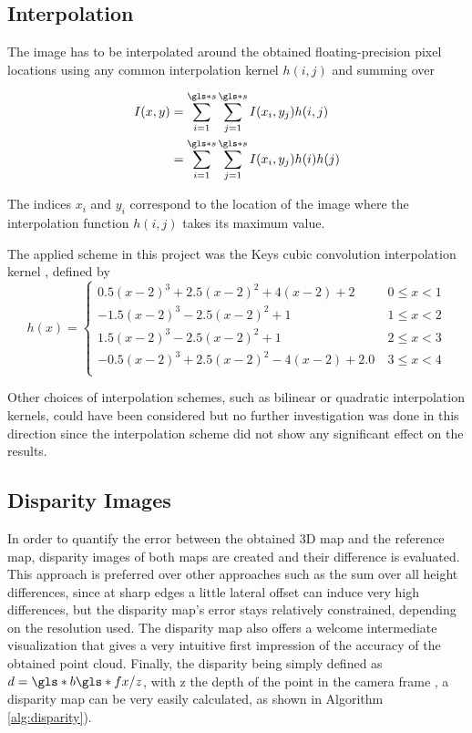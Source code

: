\subsection{Interpolation}

The image has to be interpolated around the obtained floating-precision pixel
locations using any common interpolation kernel $h(i, j)$ and summing over 

\begin{align}
  I(x, y) &= \summ{i}{s} \summ{j}{s} I(x_i, y_j) h(i, j) \\
  &= \summ{i}{s} \summ{j}{s} I(x_i, y_j) h(i) h(j)
  \label{eq:basics:interpolation}
\end{align}

The indices $x_i$ and $y_i$ correspond to the location of the image where the
interpolation function $h(i, j)$ takes its maximum value.

The applied scheme in this project was the 
Keys cubic convolution interpolation kernel \cite{Keys1981}, defined by
\begin{equation}
  h(x) = 
  \begin{cases}
     0.5(x - 2)^3 + 2.5(x-2)^2+4(x-2) + 2 & \ 0 \leq x < 1 \\
     -1.5(x-2)^3 - 2.5(x-2)^2 + 1 & \ 1 \leq x < 2 \\
     1.5(x-2)^3 - 2.5(x-2)^2 + 1 & \ 2 \leq x < 3 \\
     -0.5(x -2)^3 + 2.5(x-2)^2 - 4(x-2) + 2.0 & \ 3 \leq x < 4 \\
  \end{cases}
\end{equation}

Other choices of interpolation schemes, such as bilinear or quadratic
interpolation kernels, could have been considered but no further investigation 
was done in this direction since the interpolation scheme did not show any 
significant effect on the results. 

\subsection{Disparity Images} 

In order to quantify the error between the obtained 3D map and the reference
map, disparity images of both maps are created and their difference is evaluated. 
This approach is preferred over other approaches such as the sum over all height
differences, since at sharp edges a little lateral offset can induce very
high differences, but the disparity map's error stays relatively constrained, depending 
on the resolution used. The disparity map also offers a welcome intermediate 
visualization that gives a very intuitive first impression of the accuracy of the obtained point cloud.
Finally, the disparity being simply defined as $d = \g{b} \g{fx} / z$, with z the depth of the
point in the camera frame , a disparity map can be very easily calculated,
as shown in Algorithm \ref{alg:disparity}).

